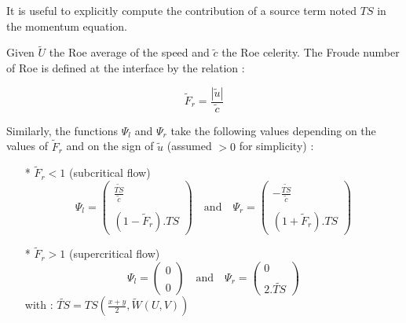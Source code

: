 It is useful to explicitly compute the contribution of a source term noted $TS$ in the momentum equation.

Given $\tilde{U}$ the Roe average of the speed and $\tilde{c}$ the Roe celerity. The Froude number of Roe is defined at the interface by the relation :

\begin{equation}
 \tilde{F}_r = \frac{|\tilde{u}|}{\tilde{c}}
\end{equation}

Similarly, the functions $\Psi_l$ and $\Psi_r$ take the following values depending on the values of $\tilde{F}_r$ and on the sign of $\tilde{u}$ (assumed $>0$ for simplicity) :

\begin{itemize}
 \item[*] $\tilde{F}_r<1$ \quad (subcritical flow)
  \begin{equation}
    \Psi_l = \left(
            \begin{array}{c}
               \frac{\tilde{TS}}{\tilde{c}}\\
               \\
               (1-\tilde{F}_r).TS
            \end{array}
          \right)
     \quad \mbox{and}\quad \Psi_r = \left(
            \begin{array}{c}
               -\frac{\tilde{TS}}{\tilde{c}}\\
               \\
               (1+\tilde{F}_r).TS
            \end{array}
          \right)
  \end{equation}
 \item[*] $\tilde{F}_r>1$ \quad (supercritical flow)
   \begin{equation}
      \Psi_l = \left(
            \begin{array}{c}
               0\\
               \\
               0
            \end{array}
          \right)
     \quad \mbox{and}\quad \Psi_r = \left(
            \begin{array}{c}
              0\\
               \\
               2.\tilde{TS}
            \end{array}
          \right)
   \end{equation}
   with : $\tilde{TS} = TS(\frac{x+y}{2},\tilde{W}(U,V))$
\end{itemize}


